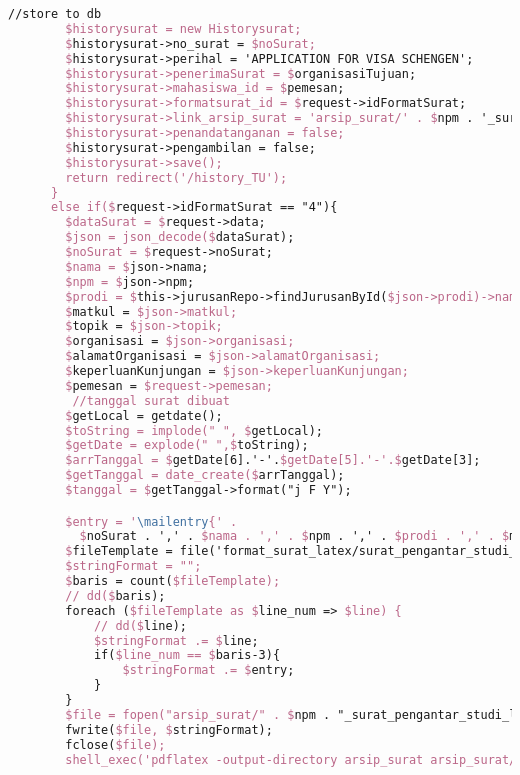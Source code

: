 \begin{lstlisting}[language=tex,basicstyle=\tiny,caption=HistorysuratController.php]
        //store to db
        $historysurat = new Historysurat;
        $historysurat->no_surat = $noSurat;
        $historysurat->perihal = 'APPLICATION FOR VISA SCHENGEN';
        $historysurat->penerimaSurat = $organisasiTujuan;
        $historysurat->mahasiswa_id = $pemesan;
        $historysurat->formatsurat_id = $request->idFormatSurat;
        $historysurat->link_arsip_surat = 'arsip_surat/' . $npm . '_surat_pengantar_pembuatan_visa.pdf';
        $historysurat->penandatanganan = false;
        $historysurat->pengambilan = false;
        $historysurat->save();
        return redirect('/history_TU');
      }
      else if($request->idFormatSurat == "4"){
        $dataSurat = $request->data;
        $json = json_decode($dataSurat);
        $noSurat = $request->noSurat;
        $nama = $json->nama;
        $npm = $json->npm;
        $prodi = $this->jurusanRepo->findJurusanById($json->prodi)->nama_jurusan;
        $matkul = $json->matkul;
        $topik = $json->topik;
        $organisasi = $json->organisasi;
        $alamatOrganisasi = $json->alamatOrganisasi;
        $keperluanKunjungan = $json->keperluanKunjungan;
        $pemesan = $request->pemesan;
         //tanggal surat dibuat
        $getLocal = getdate();
        $toString = implode(" ", $getLocal);
        $getDate = explode(" ",$toString);
        $arrTanggal = $getDate[6].'-'.$getDate[5].'-'.$getDate[3];
        $getTanggal = date_create($arrTanggal);
        $tanggal = $getTanggal->format("j F Y");

        $entry = '\mailentry{' .
          $noSurat . ',' . $nama . ',' . $npm . ',' . $prodi . ',' . $matkul . ',' . $topik . ',' . $organisasi . ',' . $alamatOrganisasi . ',' . $keperluanKunjungan . ',' . $tanggal . '}';
        $fileTemplate = file('format_surat_latex/surat_pengantar_studi_lapangan_1orang.tex');
        $stringFormat = "";
        $baris = count($fileTemplate);
        // dd($baris);
        foreach ($fileTemplate as $line_num => $line) {
            // dd($line);
            $stringFormat .= $line;
            if($line_num == $baris-3){
                $stringFormat .= $entry;
            }
        }
        $file = fopen("arsip_surat/" . $npm . "_surat_pengantar_studi_lapangan_1orang.tex", "w");
        fwrite($file, $stringFormat);
        fclose($file);
        shell_exec('pdflatex -output-directory arsip_surat arsip_surat/' . $npm . '_surat_pengantar_studi_lapangan_1orang.tex');


\end{lstlisting}
